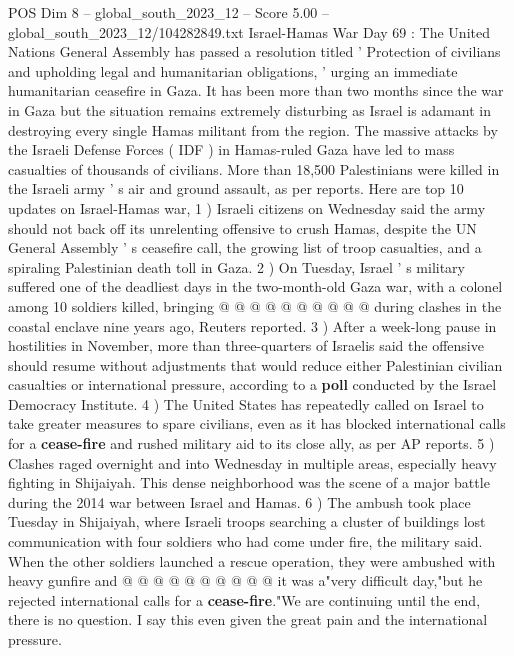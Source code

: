 \begin{textsample}{POS Dim 8 – global\_south\_2023\_12 – Score 5.00 – global\_south\_2023\_12/104282849.txt}  \label{ex:f8_pos_237}
Israel-Hamas War Day 69 : The United Nations General Assembly has passed a resolution titled ' Protection of civilians and upholding legal and humanitarian obligations, ' urging an immediate humanitarian ceasefire in Gaza.
It has been more than two months since the war in Gaza but the situation remains extremely disturbing as Israel is adamant in destroying every single Hamas militant from the region.
The massive attacks by the Israeli Defense Forces ( IDF ) in Hamas-ruled Gaza have led to mass casualties of thousands of civilians.
More than 18,500 Palestinians were killed in the Israeli army ' s air and ground assault, as per reports.
Here are top 10 updates on Israel-Hamas war, 1 ) Israeli citizens on Wednesday said the army should not back off its unrelenting offensive to crush Hamas, despite the UN General Assembly ' s ceasefire call, the growing list of troop casualties, and a spiraling Palestinian death toll in Gaza. 2 ) On Tuesday, Israel ' s military suffered one of the deadliest days in the two-month-old Gaza war, with a colonel among 10 soldiers killed, bringing @ @ @ @ @ @ @ @ @ @ during clashes in the coastal enclave nine years ago, Reuters reported. 3 ) After a week-long pause in hostilities in November, more than three-quarters of Israelis said the offensive should resume without adjustments that would reduce either Palestinian civilian casualties or international pressure, according to a \textbf{poll} conducted by the Israel Democracy Institute. 4 ) The United States has repeatedly called on Israel to take greater measures to spare civilians, even as it has blocked international calls for a \textbf{cease-fire} and rushed military aid to its close ally, as per AP reports. 5 ) Clashes raged overnight and into Wednesday in multiple areas, especially heavy fighting in Shijaiyah.
This dense neighborhood was the scene of a major battle during the 2014 war between Israel and Hamas. 6 ) The ambush took place Tuesday in Shijaiyah, where Israeli troops searching a cluster of buildings lost communication with four soldiers who had come under fire, the military said.
When the other soldiers launched a rescue operation, they were ambushed with heavy gunfire and @ @ @ @ @ @ @ @ @ @ it was a"very difficult day,"but he rejected international calls for a \textbf{cease-fire}."We are continuing until the end, there is no question.
I say this even given the great pain and the international pressure.

\end{textsample}
